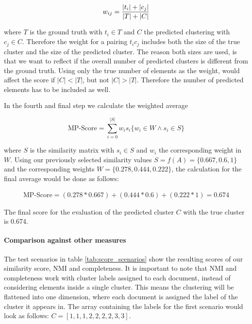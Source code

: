 \begin{equation}
    \label{equ:weight}
        w_{ij} = \frac{|t_i| + |c_j|}{|T|+|C|} \\
\end{equation}

where $T$ is the ground truth with $t_i \in T$ and $C$ the predicted clustering with  $c_j \in C$. Therefore the weight for a pairing $t_ic_j$ includes both the size of the true cluster and the size of the predicted cluster. The reason both sizes are used, is that we want to reflect if the overall number of predicted clusters is different from the ground truth. Using only the true number of elements as the weight, would affect the score if $|C| < |T|$, but not $|C| > |T|$. Therefore the number of predicted elements has to be included as well.

In the fourth and final step we calculate the weighted average

\begin{equation}
    \label{equ:weighted_average}
        \text{MP-Score} = \sum_{i=0}^{|S|} w_is_i \{w_i \in W \wedge s_i \in S\}
\end{equation}

where $S$ is the similarity matrix with $s_{i} \in S$ and $w_i$ the corresponding weight in $W$. Using our previously selected similarity values $S = f(A) = \{0.667, 0.6, 1\}$ and the corresponding weights $W = \{0.278, 0.444, 0.222\}$, the calculation for the final average would be done as follows:

\begin{align*}
    \text{MP-Score} = (0.278 * 0.667) + (0.444 * 0.6) + (0.222 * 1) = \mathbf{0.674}
\end{align*}

The final score for the evaluation of the predicted cluster $C$ with the true cluster is 0.674.

\paragraph{Comparison against other measures}

The test scenarios in table \ref{tab:score_scenarios} show the resulting scores of our similarity score, NMI and completeness. It is important to note that NMI and completeness work with cluster labels assigned to each document, instead of considering elements inside a single cluster. This means the clustering will be flattened into one dimension, where each document is assigned the label of the cluster it appears in. The array containing the labels for the first scenario would look as follows: $C=[1,1,1,2,2,2,2,3,3]$.

